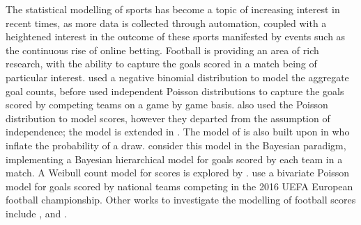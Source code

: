 \documentclass[11pt,a4paper]{article}
\begin{document}
The statistical modelling of sports has become a topic of increasing 
interest in recent times, as more data is collected through automation, 
coupled with a heightened interest in the outcome of these 
sports manifested by events such as the continuous rise of online betting. Football is 
providing an area of rich research, with the ability to capture the 
goals scored in a match being of particular interest. \cite{reep_1971} 
used a negative binomial distribution to model the aggregate goal 
counts, before \cite{maher_1982} used independent Poisson distributions 
to capture the goals scored by competing teams on a game by game basis. 
\cite{dixon_1997} also used the Poisson distribution to model scores, 
however they departed from the assumption of independence; the model 
is extended in \cite{dixon_1998}. The model of \cite{dixon_1997} is 
also built upon in \cite{karlis_2000, karlis_2003} who inflate the 
probability of a draw. \cite{baio_2010} consider this model in the 
Bayesian paradigm, implementing a Bayesian hierarchical model for 
goals scored by each team in a match. A Weibull count model for scores 
is explored by \cite{boshnakov_2017}. \cite{groll_2018} use a bivariate 
Poisson model for goals scored by national teams competing in the 2016 
UEFA European football championship. Other works to investigate the 
modelling of football scores include \cite{lee_1997}, 
\cite{joseph_2006} and \cite{karlis_2009}.
\end{document}
